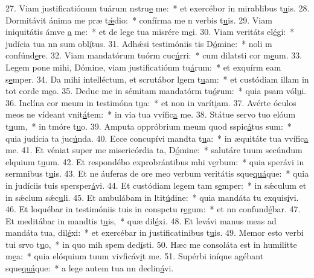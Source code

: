 27. Viam justificatiónum tuárum nstru\uline{e} me:~* et exercébor in mirablibus t\uline{u}is.
28. Dormitávit ánima me præ t\uline{ǽ}dio:~* confírma me n verbis t\uline{u}is.
29. Viam iniquitátis ámve \uline{a} me:~* et de lege tua misrére m\uline{e}i.
30. Viam veritáts el\uline{é}gi:~* judícia tua nn sum obl\uline{í}tus.
31. Adhǽsi testimóniis tis D\uline{ó}mine:~* noli m confúnd\uline{e}re.
32. Viam mandatórum tuórm cuc\uline{ú}rri:~* cum dilatsti cor m\uline{e}um.
33. Legem pone mihi, Dómine, viam justificatiónm tu\uline{á}rum:~* et exquírm eam s\uline{e}mper.
34. Da mihi intelléctum, et scrutábor lgem t\uline{u}am:~* et custódiam illam in tot corde m\uline{e}o.
35. Deduc me in sémitam mandatórm tu\uline{ó}rum:~* quia psam vól\uline{u}i.
36. Inclína cor meum in testimóna t\uline{u}a:~* et non in varít\uline{i}am.
37. Avérte óculos meos ne vídeant vnit\uline{á}tem:~* in via tua vvífic\uline{a} me.
38. Státue servo tuo elóum t\uline{u}um,~* in tmóre t\uline{u}o.
39. Amputa oppróbrium meum quod sspic\uline{á}tus sum:~* quia judícia ta juc\uline{ú}nda.
40. Ecce concupívi mandta t\uline{u}a:~* in æquitáte tua vvífic\uline{a} me.
41. Et véniat super me misericórdia ta, D\uline{ó}mine:~* salutáre tuum secúndum elquium t\uline{u}um.
42. Et respondébo exprobrántibus mhi v\uline{e}rbum:~* quia sperávi in sermnibus t\uline{u}is.
43. Et ne áuferas de ore meo verbum veritátis sque\uline{quá}que:~* quia in judíciis tuis spersper\uline{á}vi.
44. Et custódiam legem tam s\uline{e}mper:~* in sǽculum et in sǽclum sǽc\uline{u}li.
45. Et ambulábam in ltit\uline{ú}dine:~* quia mandáta tu exquis\uline{í}vi.
46. Et loquébar in testimóniis tuis in conspctu r\uline{e}gum:~* et nn confund\uline{é}bar.
47. Et meditábar in mandtis t\uline{u}is,~* quæ dil\uline{é}xi.
48. Et levávi manus meas ad mandáta tua,  dil\uline{é}xi:~* et exercébar in justificatinibus t\uline{u}is.
49. Memor esto verbi tui srvo t\uline{u}o,~* in quo mih spem ded\uline{í}sti.
50. Hæc me consoláta est in humilitte m\uline{e}a:~* quia elóquium tuum vivficáv\uline{i}t me.
51. Supérbi iníque agébant sque\uline{quá}que:~* a lege autem tua nn declin\uline{á}vi.
